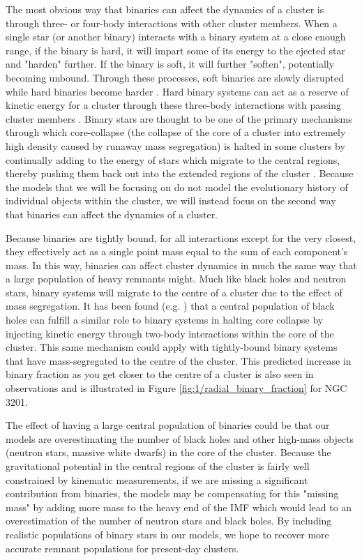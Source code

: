 The most obvious way that binaries can affect the dynamics of a cluster is through three- or
four-body interactions with other cluster members. When a single star (or another binary) interacts
with a binary system at a close enough range, if the binary is hard, it will impart some of its
energy to the ejected star and "harden" further. If the binary is soft, it will further "soften",
potentially becoming unbound. Through these processes, soft binaries are slowly disrupted while hard
binaries become harder \citep{Heggie1975}. Hard binary systems can act as a reserve of kinetic
energy for a cluster through these three-body interactions with passing cluster members
\citep{Heggie2003}. Binary stars are thought to be one of the primary mechanisms through which
core-collapse (the collapse of the core of a cluster into extremely high density caused by runaway
mass segregation) is halted in some clusters by continually adding to the energy of stars which
migrate to the central regions, thereby pushing them back out into the extended regions of the
cluster \citep{Chatterjee2013}. Because the models that we will be focusing on do not model the
evolutionary history of individual objects within the cluster, we will instead focus on the second
way that binaries can affect the dynamics of a cluster.

Because binaries are tightly bound, for all interactions except for the very closest, they
effectively act as a single point mass equal to the sum of each component's mass. In this way,
binaries can affect cluster dynamics in much the same way that a large population of heavy remnants
might. Much like black holes and neutron stars, binary systems will migrate to the centre of a
cluster due to the effect of mass segregation. It has been found (e.g. \citealt{Kremer2019}) that a
central population of black holes can fulfill a similar role to binary systems in halting core
collapse by injecting kinetic energy through two-body interactions within the core of the cluster.
This same mechanism could apply with tightly-bound binary systems that have mass-segregated to the
centre of the cluster. This predicted increase in binary fraction as you get closer to the centre of
a cluster is also seen in observations and is illustrated in Figure
\ref{fig:1/radial_binary_fraction} for NGC 3201.

The effect of having a large central population of binaries could be that our models are
overestimating the number of black holes and other high-mass objects (neutron stars, massive white
dwarfs) in the core of the cluster. Because the gravitational potential in the central regions of
the cluster is fairly well constrained by kinematic measurements, if we are missing a significant
contribution from binaries, the models may be compensating for this "missing mass" by adding more
mass to the heavy end of the IMF which would lead to an overestimation of the number of neutron
stars and black holes. By including realistic populations of binary stars in our models, we hope to
recover more accurate remnant populations for present-day clusters.




